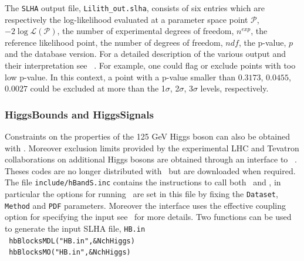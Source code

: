 \documentclass[12pt,a4paper]{article}
\begin{document}
The {\tt SLHA} output file, \verb|Lilith_out.slha|, consists of six entries which are respectively the log-likelihood evaluated at a parameter space point $\mathcal{P}$, $-2\log\mathcal{L}(\mathcal{P})$, the number of experimental degrees of freedom, $n^{exp}$, the reference likelihood point,  the number of degrees of freedom, $ndf$, the p-value, $p$ and the database version.
 For a detailed description of the various output and their interpretation see ~\cite{Bernon:2015hsa}. For example, one could flag or exclude points with too low p-value. In this context, a point with a p-value smaller than $0.3173$, $0.0455$, $0.0027$ could be excluded at more than the 1$\sigma$, 2$\sigma$, 3$\sigma$ levels, respectively.


\subsubsection{HiggsBounds and HiggsSignals}

Constraints on the properties of the 125 GeV Higgs boson can also  be obtained with \HS.
Moreover exclusion limits provided by the experimental LHC and Tevatron collaborations on additional Higgs bosons are obtained through an interface to \HB~\cite{Bechtle:2011sb}.
Theses codes are no longer distributed with \micro\ but are downloaded when required. 
The file {\tt include/hBandS.inc}  contains the instructions  to call both \HB\ and \HS,  in particular the options for running \HS\ are set in this file by  fixing the  \verb|Dataset|, \verb|Method| and
\verb|PDF| parameters. Moreover the interface uses  the effective coupling option for specifying the input see~\cite{Bechtle:2013wla} for more details. 
Two  functions can be used to generate the input SLHA file, \verb|HB.in|\\

\noindent
\verb| hbBlocksMDL("HB.in",&NchHiggs) | \\
\verb| hbBlocksMO("HB.in",&NchHiggs) | \\
\end{document}
